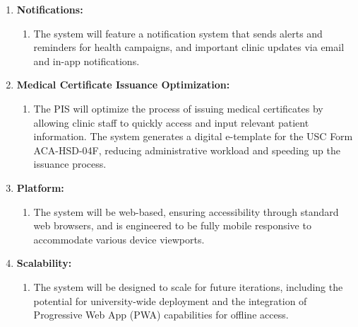 \begin{enumerate}
    \begin{enumerate}
        \item The system will include a report generation module that allows clinic staff to create detailed, customizable reports on various metrics such as patient visits, clinical case distribution, and feedback analysis. These reports will be exportable to formats like PDF and Excel for further analysis and record-keeping.
    \end{enumerate}
    \item \textbf{Notifications:}
    \begin{enumerate}
        \item The system will feature a notification system that sends alerts and reminders for health campaigns, and important clinic updates via email and in-app notifications.
    \end{enumerate}
    \item \textbf{Medical Certificate Issuance Optimization:}
    \begin{enumerate}
        \item The PIS will optimize the process of issuing medical certificates by allowing clinic staff to quickly access and input relevant patient information. The system generates a digital e-template for the USC Form ACA-HSD-04F, reducing administrative workload and speeding up the issuance process.
    \end{enumerate}
    \item \textbf{Platform:}
    \begin{enumerate}
        \item The system will be web-based, ensuring accessibility through standard web browsers, and is engineered to be fully mobile responsive to accommodate various device viewports.
    \end{enumerate}
    \item \textbf{Scalability:}
    \begin{enumerate}
        \item The system will be designed to scale for future iterations, including the potential for university-wide deployment and the integration of Progressive Web App (PWA) capabilities for offline access.
    \end{enumerate}
\end{enumerate}

